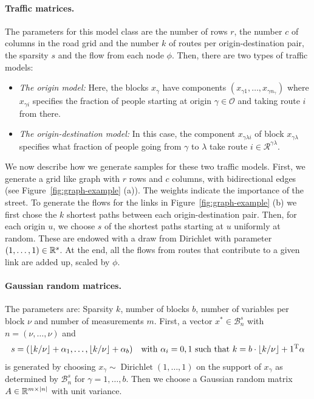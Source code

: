 \documentclass{article} %
\newcommand{\OO}{\mathcal{O}}
\newcommand{\RR}{\mathcal{R}}
\begin{document}
\paragraph{Traffic matrices.} The parameters for this model class are the number of rows $r$, the number $c$ of columns in the road grid and the number $k$ of routes per origin-destination pair, the sparsity $s$ and the flow from each node $\phi$. Then, there are two types of traffic models:
\begin{itemize}
  \item \emph{The origin model:} Here, the blocks $x_\gamma$ have
    components $(x_{\gamma1}, \dots, x_{\gamma n_\gamma})$ where
    $x_{\gamma i}$ specifies the fraction of people starting at origin
    $\gamma\in\OO$ and taking route $i$ from there.
  \item \emph{The origin-destination model:} In this case, the component $x_{\gamma\lambda i}$ of block $x_{\gamma\lambda}$ specifies what fraction of people going from $\gamma$ to $\lambda$ take route $i\in \RR^{\gamma\lambda}$.
\end{itemize}
We now describe how we generate samples for these two traffic models.
First, we generate a grid like graph with $r$ rows and $c$ columns, with bidirectional edges (see Figure~\ref{fig:graph-example} (a)). The weights indicate the importance of the street.
To generate the flows for the links in Figure~\ref{fig:graph-example} (b) we first chose the $k$ shortest paths between each origin-destination pair.
Then, for each origin $u$, we choose $s$ of the shortest paths starting at $u$ uniformly at random.
These are endowed with a draw from Dirichlet with parameter $(1, \dots, 1)\in \mathbb{R}^s$.
At the end, all the flows from routes that contribute to a given link are added up, scaled by $\phi$.

\paragraph{Gaussian random matrices.} The parameters are: Sparsity $k$, number of blocks $b$, number of variables per block $\nu$ and number of measurements $m$.
First, a vector $x^*\in \mathcal B_n^s$ with $n = (\nu, \dots, \nu)$ and
\begin{equation*}
s = (\lfloor k/\nu\rfloor + \alpha_1, \dots, \lfloor k/\nu\rfloor + \alpha_b)\quad\text{with $\alpha_i = 0, 1$ such that $k = b\cdot \lfloor k/\nu\rfloor + 1^{\rm T} \alpha$}
\end{equation*}
is generated by choosing $x_\gamma \sim \operatorname{Dirichlet}(1,
\dots, 1)$ on the support of $x_\gamma$ as determined by $\mathcal
B_n^s$ for $\gamma = 1, \dots, b$. Then we choose a Gaussian random matrix $A\in \mathbb{R}^{m\times |n|}$ with unit variance.
\end{document}
